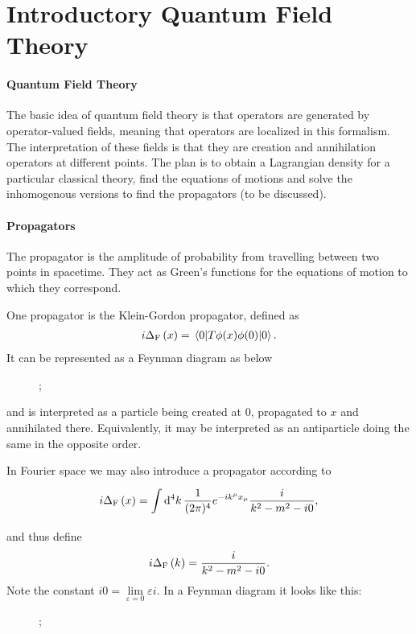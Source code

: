 \section{Introductory Quantum Field Theory}

\paragraph{Quantum Field Theory}
The basic idea of quantum field theory is that operators are generated by operator-valued fields, meaning that operators are localized in this formalism. The interpretation of these fields is that they are creation and annihilation operators at different points. The plan is to obtain a Lagrangian density for a particular classical theory, find the equations of motions and solve the inhomogenous versions to find the propagators (to be discussed).

\paragraph{Propagators}
The propagator is the amplitude of probability from travelling between two points in spacetime. They act as Green's functions for the equations of motion to which they correspond.

One propagator is the Klein-Gordon propagator, defined as
\begin{align*}
	i\Delta_{\text{F}}\left(x\right) = \expval{\ensuremath{T}{\phi(x)}{\phi(0)}}{0}.
\end{align*}
It can be represented as a Feynman diagram as below
\begin{figure}[!ht]
	\centering
	;
\end{figure}
and is interpreted as a particle being created at $0$, propagated to $x$ and annihilated there. Equivalently, it may be interpreted as an antiparticle doing the same in the opposite order.

In Fourier space we may also introduce a propagator according to
\begin{align*}
	i\Delta_{\text{F}}\left(x\right) = \int\limits_{}^{}\dd[4]{k}\frac{1}{(2\pi)^{4}}e^{-ik^{\mu}x_{\mu}}\frac{i}{k^{2} - m^{2} - i0},
\end{align*}
and thus define
\begin{align*}
i\Delta_{\text{F}}\left(k\right) = \frac{i}{k^{2} - m^{2} - i0}.
\end{align*}
Note the constant $i0 = \lim\limits_{\varepsilon = 0}\varepsilon i$. In a Feynman diagram it looks like this:
\begin{figure}[!ht]
	\centering
	;
\end{figure}

